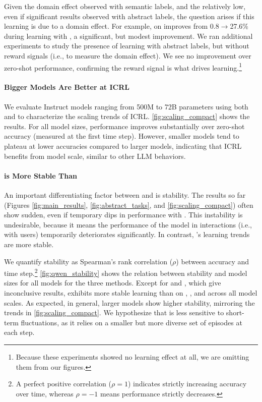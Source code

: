 Given the domain effect observed with semantic labels, and the relatively low, even if significant results observed with abstract labels, the question arises if this learning is due to a domain effect. 
For example, \llama on \clinic improves from 0.8$\rightarrow$27.6\% during learning with \naiveplusshort, a significant, but modest improvement. 
We ran additional experiments to study the presence of learning with abstract labels, but without reward signals (i.e., to measure the domain effect). We see no improvement over zero-shot performance, confirming the reward signal is what drives learning.\footnote{Because these experiments showed no learning effect at all, we are omitting them from our figures.} 





\paragraph{Bigger Models Are Better at ICRL}

We evaluate  \qwen Instruct models ranging from 500M to 72B parameters using both \naiveplusshort and \expshort to characterize the scaling trends of ICRL. 
\autoref{fig:scaling_compact} shows the results. 
For all model sizes, performance improves substantially over zero-shot accuracy (measured at the first time step). 
However, smaller models tend to plateau at lower accuracies compared to larger models, indicating that ICRL benefits from model scale, similar to other LLM behaviors. 

\paragraph{\expshort is More Stable Than \naiveplusshort}

An important differentiating factor between \expshort and \naiveplusshort is stability. 
The results so far (Figures \ref{fig:main_results}, \ref{fig:abstract_tasks}, and \ref{fig:scaling_compact}) often show sudden, even if temporary dips in performance with \naiveplusshort. 
This instability is undesirable, because it means the performance of the model in interactions (i.e., with users) temporarily deteriorates significantly. 
In contrast, \expshort's learning trends are more stable. 

We quantify stability as Spearman’s rank correlation ($\rho$) between accuracy and time step.\footnote{A perfect positive correlation ($\rho = 1$) indicates strictly increasing accuracy over time, whereas $\rho = -1$ means performance strictly decreases.}  
\autoref{fig:qwen_stability} shows the relation between stability and model sizes for all \qwen models for the three methods. 
Except for \trec and \trecfine, which give inconclusive results, \expshort exhibits more stable learning than \naiveplusshort on \banking, \clinic, and \nlu across all model scales.  
As expected, in general, larger models show higher stability, mirroring the trends in \autoref{fig:scaling_compact}. 
We hypothesize that \expshort is less sensitive to short-term fluctuations, as it relies on a smaller but more diverse set of episodes at each step.

